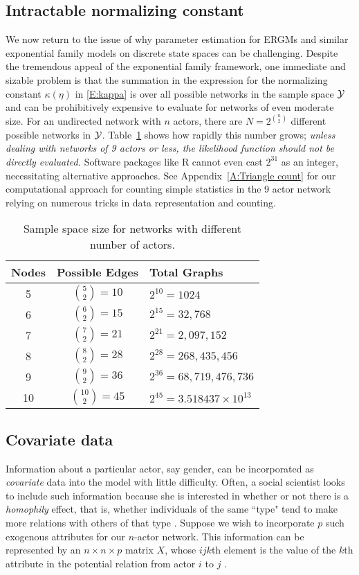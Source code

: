 \subsection{Intractable normalizing constant} \label{S:intractable}
We now return to the issue of why parameter estimation for ERGMs and 
similar exponential family models on discrete state spaces can be challenging.
Despite the tremendous appeal of the exponential family framework, one 
immediate and sizable problem is that the summation in the expression for  the 
normalizing constant $\kappa(\eta)$ in \eqref{E:kappa}
is over all possible networks in the sample space ${\mathcal Y}$ and can be prohibitively expensive to 
evaluate for networks of even moderate size.
For an undirected network with $n$ actors, there are $N=2^{{n\choose 2} }$ 
different possible networks in ${\mathcal Y}$.  Table~\ref{T:number graphs} shows how rapidly this number grows; 
\emph{unless dealing with networks of 9 actors or less, the likelihood function 
should not be directly evaluated.}  Software packages like R cannot even cast 
$2^{31}$ as an integer,
necessitating alternative approaches.  See Appendix~\ref{A:Triangle count}
for our computational approach for counting simple statistics in the 9 actor network
relying on numerous tricks in data representation and counting.

\begin{table}[h] \label{T:number graphs}
\caption{Sample space size for networks with different number of actors.}
\begin{tabular}{ccl}
\hline 
Nodes & Possible Edges & Total Graphs \\ [1ex]
\hline
5 & ${5 \choose 2} = 10$ & $2^{10} = 1024$ \\ [1ex]
6 & ${6 \choose 2} = 15$ & $2^{15} = 32,768$ \\ [1ex]
7 & ${7 \choose 2} = 21$ & $2^{21} = 2,097,152$ \\ [1ex]
8 & ${8 \choose 2} = 28$ & $2^{28} = 268,435,456$ \\ [1ex]
9 & ${9 \choose 2} = 36$ & $2^{36} = 68,719,476,736$ \\ [1ex]
10 & ${10 \choose 2} = 45$ & $2^{45} = 3.518437\times10^{13}$ \\ [1ex]
\hline 
\end{tabular}
\end{table}

\subsection{Covariate data}
Information about a particular actor, say gender, can be incorporated as 
\textit{covariate} data into the model with little difficulty.
Often, a social scientist looks to include such information because she is interested in
whether or not there is a \emph{homophily} effect, that is, whether individuals of the 
same ``type" tend to make more relations with others of that type \citep{Wasserman:1994}.  
Suppose we wish to incorporate $p$ such exogenous attributes for our $n$-actor network.  
This information can be represented by an $n \times n \times p$ matrix $X$, whose 
$ijk$th element is the value of the $k$th attribute in the potential relation from actor
$i$ to $j$ \citep*{Fienberg:1981,ergm}.  

